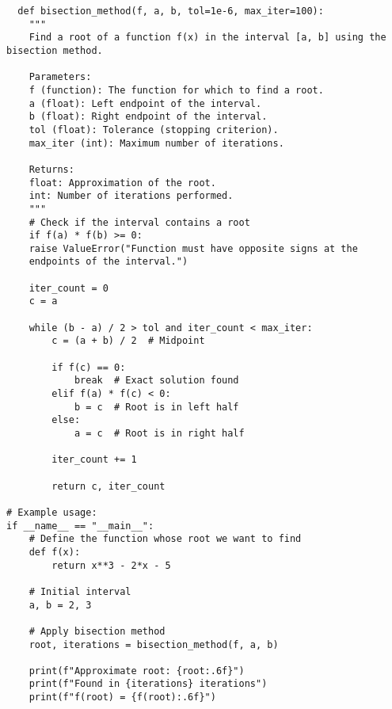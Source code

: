 \documentclass[aima203_lecturenotes_ku.tex]{subfiles}
\begin{document}
\begin{lstlisting}
  def bisection_method(f, a, b, tol=1e-6, max_iter=100):
    """
    Find a root of a function f(x) in the interval [a, b] using the bisection method.

    Parameters:
    f (function): The function for which to find a root.
    a (float): Left endpoint of the interval.
    b (float): Right endpoint of the interval.
    tol (float): Tolerance (stopping criterion).
    max_iter (int): Maximum number of iterations.

    Returns:
    float: Approximation of the root.
    int: Number of iterations performed.
    """
    # Check if the interval contains a root
    if f(a) * f(b) >= 0:
    raise ValueError("Function must have opposite signs at the
    endpoints of the interval.")

    iter_count = 0
    c = a

    while (b - a) / 2 > tol and iter_count < max_iter:
        c = (a + b) / 2  # Midpoint

        if f(c) == 0:
            break  # Exact solution found
        elif f(a) * f(c) < 0:
            b = c  # Root is in left half
        else:
            a = c  # Root is in right half

        iter_count += 1

        return c, iter_count

# Example usage:
if __name__ == "__main__":
    # Define the function whose root we want to find
    def f(x):
        return x**3 - 2*x - 5

    # Initial interval
    a, b = 2, 3

    # Apply bisection method
    root, iterations = bisection_method(f, a, b)

    print(f"Approximate root: {root:.6f}")
    print(f"Found in {iterations} iterations")
    print(f"f(root) = {f(root):.6f}")
\end{lstlisting}
\end{document}
